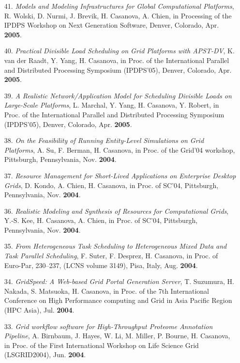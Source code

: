 \begin{enumerate}
\item [41.]
{\it Models and Modeling Infrastructures for Global Computational Platforms},
R. Wolski, D. Nurmi, J. Brevik, H. Casanova, A. Chien,
in Processing of the IPDPS Workshop on Next Generation Software,
Denver, Colorado, Apr. {\bf 2005}.

\item [40.] 
{\it Practical Divisible Load Scheduling on Grid Platforms with
APST-DV}, K. van der Raadt, Y. Yang, H. Casanova, in Proc. of
the International Parallel and Distributed Processing Symposium
(IPDPS'05), Denver, Colorado, Apr. {\bf 2005}.

\item [39.] {\it A Realistic Network/Application Model for Scheduling
Divisible Loads on Large-Scale Platforms}, L. Marchal, Y. Yang, H.
Casanova, Y. Robert, in Proc. of
the International Parallel and Distributed Processing Symposium
(IPDPS'05), Denver, Colorado, Apr. {\bf 2005}.

\item [38.] 
{\it On the Feasibility of Running Entity-Level Simulations on
Grid Platforms}, A. Su, F. Berman, H. Casanova, in Proc. of the
Grid'04 workshop, Pittsburgh, Pennsylvania, Nov. {\bf 2004}.

\item [37.] {\it Resource Management for Short-Lived Applications on
Enterprise Desktop Grids}, D. Kondo, A. Chien, H. Casanova, in Proc.
of SC'04, Pittsburgh, Pennsylvania, Nov. {\bf 2004}.

\item [36.] {\it Realistic Modeling and Synthesis of Resources for
Computational Grids}, Y.-S. Kee, H. Casanova, A. Chien, in Proc. of
SC'04, Pittsburgh, Pennsylvania, Nov. {\bf 2004}.

\item [35.]
{\it From Heterogeneous Task Scheduling to Heterogeneous Mixed Data and
Task Parallel Scheduling}, F. Suter, F. Desprez, H. Casanova, in
Proc. of Euro-Par, 230--237, (LCNS volume 3149), Pisa, Italy, Aug. {\bf 2004}.

\item [34.]  {\it GridSpeed: A Web-based Grid Portal Generation Server}, T.
Suzumura, H. Nakada, S. Matsuoka, H. Casanova, in Proc. of the 7th
International Conference on High Performance computing and Grid in Asia
Pacific Region (HPC Asia), Jul. {\bf 2004}.

\item [33.]
{\it Grid workflow software for High-Throughput Proteome Annotation
Pipeline}, A. Birnbaum, J. Hayes, W. Li, M. Miller, P. Bourne,
H. Casanova, in Proc. of the First International Workshop
on Life Science Grid (LSGRID2004), Jun. {\bf 2004}.


\end{enumerate}
